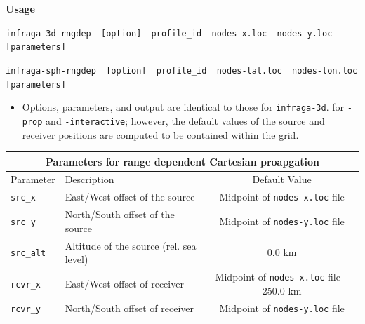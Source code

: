 \documentclass[10pt]{article}
\begin{document}
\vspace{0.02\textheight}

 \hspace{-0.25in}\textbf{Usage} 
 
\begin{center} 
\verb=infraga-3d-rngdep  [option]  profile_id  nodes-x.loc  nodes-y.loc  [parameters]=
\end{center}

\begin{center} 
\verb=infraga-sph-rngdep  [option]  profile_id  nodes-lat.loc  nodes-lon.loc  [parameters]=
\end{center}

\begin{itemize}
 \item Options, parameters, and output are identical to those for \verb=infraga-3d=. for \verb=-prop= and \verb=-interactive=; however, the default values of the source and receiver positions are computed to be contained within the grid.
  \end{itemize}

 \begin{tabular}{ | l | l | c | }
  \hline
  \multicolumn{3}{|c|}{\textbf{Parameters for range dependent Cartesian proapgation}} \\
  \hline
  Parameter & Description & Default Value \\
  \hline \hline
 \verb=src_x=  			& East/West offset of the source						& Midpoint of \verb=nodes-x.loc= file \\
 \verb=src_y=  			& North/South offset of the source						& Midpoint of \verb=nodes-y.loc= file \\
 \verb=src_alt=  		& Altitude of the source (rel. sea level)					& \(0.0\) km \\ \hline
 \verb=rcvr_x= 			& East/West offset of receiver							& Midpoint of \verb=nodes-x.loc= file -- 250.0 km	\\
 \verb=rcvr_y= 			& North/South offset of receiver							&Midpoint of \verb=nodes-y.loc= file \\ \hline
\end{tabular}

 
\vspace{0.01\textheight}
\end{document}
